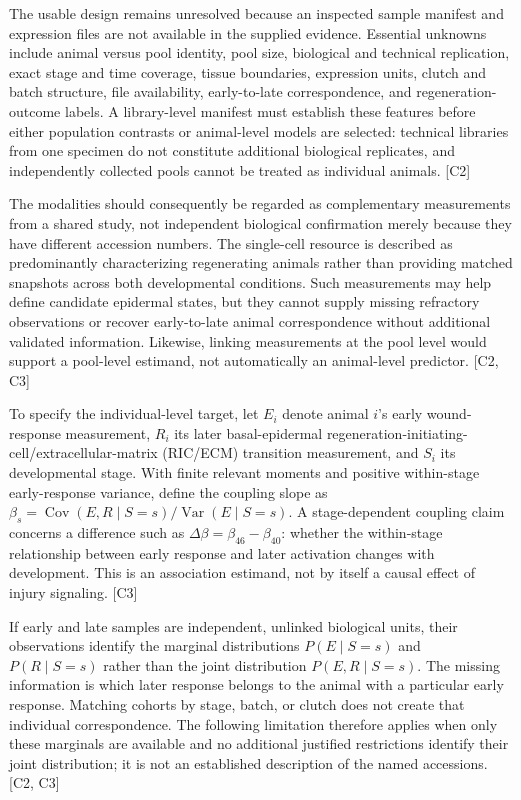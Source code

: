 \documentclass[11pt]{article}
\begin{document}
The usable design remains unresolved because an inspected sample manifest and expression files are not available in the supplied evidence. Essential unknowns include animal versus pool identity, pool size, biological and technical replication, exact stage and time coverage, tissue boundaries, expression units, clutch and batch structure, file availability, early-to-late correspondence, and regeneration-outcome labels. A library-level manifest must establish these features before either population contrasts or animal-level models are selected: technical libraries from one specimen do not constitute additional biological replicates, and independently collected pools cannot be treated as individual animals. [C2]

The modalities should consequently be regarded as complementary measurements from a shared study, not independent biological confirmation merely because they have different accession numbers. The single-cell resource is described as predominantly characterizing regenerating animals rather than providing matched snapshots across both developmental conditions. Such measurements may help define candidate epidermal states, but they cannot supply missing refractory observations or recover early-to-late animal correspondence without additional validated information. Likewise, linking measurements at the pool level would support a pool-level estimand, not automatically an animal-level predictor. [C2, C3]

To specify the individual-level target, let $E_i$ denote animal $i$\textquoteright{}s early wound-response measurement, $R_i$ its later basal-epidermal regeneration-initiating-cell/extracellular-matrix (RIC/ECM) transition measurement, and $S_i$ its developmental stage. With finite relevant moments and positive within-stage early-response variance, define the coupling slope as $\beta_s=\operatorname{Cov}(E,R\mid S=s)/\operatorname{Var}(E\mid S=s)$. A stage-dependent coupling claim concerns a difference such as $\Delta\beta=\beta_{46}-\beta_{40}$: whether the within-stage relationship between early response and later activation changes with development. This is an association estimand, not by itself a causal effect of injury signaling. [C3]

If early and late samples are independent, unlinked biological units, their observations identify the marginal distributions $P(E\mid S=s)$ and $P(R\mid S=s)$ rather than the joint distribution $P(E,R\mid S=s)$. The missing information is which later response belongs to the animal with a particular early response. Matching cohorts by stage, batch, or clutch does not create that individual correspondence. The following limitation therefore applies when only these marginals are available and no additional justified restrictions identify their joint distribution; it is not an established description of the named accessions. [C2, C3]
\end{document}
